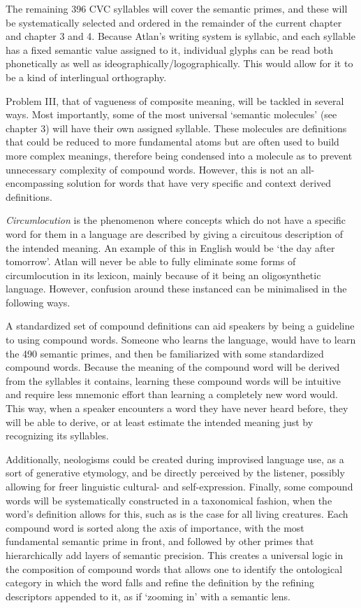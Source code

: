 The remaining 396 CVC syllables will cover the semantic primes, and these will be systematically selected and ordered in the remainder of the current chapter and chapter 3 and 4. Because Atlan’s writing system is syllabic, and each syllable has a fixed semantic value assigned to it, individual glyphs can be read both phonetically as well as ideographically/logographically. This would allow for it to be a kind of interlingual orthography. 

Problem III, that of vagueness of composite meaning, will be tackled in several ways. Most importantly, some of the most universal ‘semantic molecules’ (see chapter 3) will have their own assigned syllable. These molecules are definitions that could be reduced to more fundamental atoms but are often used to build more complex meanings, therefore being condensed into a molecule as to prevent unnecessary complexity of compound words. However, this is not an all-encompassing solution for words that have very specific and context derived definitions. 

{\it Circumlocution} is the phenomenon where concepts which do not have a specific word for them in a language are described by giving a circuitous description of the intended meaning. An example of this in English would be ‘the day after tomorrow’. Atlan will never be able to fully eliminate some forms of circumlocution in its lexicon, mainly because of it being an oligosynthetic language. However, confusion around these instanced can be minimalised in the following ways.  

A standardized set of compound definitions can aid speakers by being a guideline to using compound words. Someone who learns the language, would have to learn the 490 semantic primes, and then be familiarized with some standardized compound words. Because the meaning of the compound word will be derived from the syllables it contains, learning these compound words will be intuitive and require less mnemonic effort than learning a completely new word would. This way, when a speaker encounters a word they have never heard before, they will be able to derive, or at least estimate the intended meaning just by recognizing its syllables.

Additionally, neologisms could be created during improvised language use, as a sort of generative etymology, and be directly perceived by the listener, possibly allowing for freer linguistic cultural- and self-expression. Finally, some compound words will be systematically constructed in a taxonomical fashion, when the word’s definition allows for this, such as is the case for all living creatures. Each compound word is sorted along the axis of importance, with the most fundamental semantic prime in front, and followed by other primes that hierarchically add layers of semantic precision. This creates a universal logic in the composition of compound words that allows one to identify the ontological category in which the word falls and refine the definition by the refining descriptors appended to it, as if ‘zooming in’ with a semantic lens.


